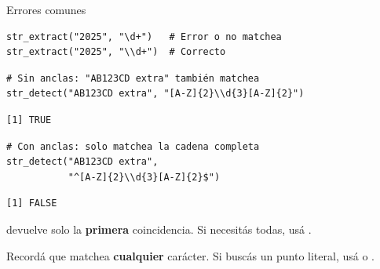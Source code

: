 \documentclass[8pt]{beamer}
\begin{document}
\begin{frame}[fragile]{Errores comunes}
\begin{lstlisting}[style=RScript]
str_extract("2025", "\d+")   # Error o no matchea
str_extract("2025", "\\d+")  # Correcto
\end{lstlisting}

\begin{lstlisting}[style=RScript]
# Sin anclas: "AB123CD extra" también matchea
str_detect("AB123CD extra", "[A-Z]{2}\\d{3}[A-Z]{2}")
\end{lstlisting}
\begin{lstlisting}[style=RConsole]
[1] TRUE
\end{lstlisting}
\begin{lstlisting}[style=RScript]
# Con anclas: solo matchea la cadena completa
str_detect("AB123CD extra",
           "^[A-Z]{2}\\d{3}[A-Z]{2}$")
\end{lstlisting}
\begin{lstlisting}[style=RConsole]
[1] FALSE
\end{lstlisting}
\end{frame}






\begin{frame}[fragile]
 devuelve solo la \textbf{primera} coincidencia. Si necesitás todas, usá .

Recordá que  matchea \textbf{cualquier} carácter. Si buscás un punto literal, usá  o .
\end{frame}
\end{document}
